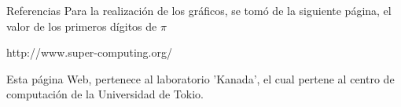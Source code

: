 \begin{section}{Referencias}
	Para la realización de los gráficos, se tomó de la siguiente página, el valor de los primeros dígitos de $\pi$
	
	http://www.super-computing.org/
	
	Esta página Web, pertenece al laboratorio 'Kanada', el cual pertene al centro de computación de la Universidad de Tokio.


\end{section}
